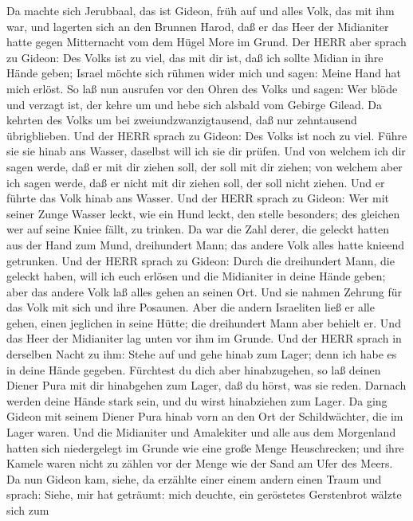  Da machte sich Jerubbaal, das ist Gideon, früh auf und
alles Volk, das mit ihm war, und lagerten sich an den Brunnen Harod, daß
er das Heer der Midianiter hatte gegen Mitternacht vom dem Hügel More im
Grund.  Der HERR aber sprach zu Gideon: Des Volks ist zu
viel, das mit dir ist, daß ich sollte Midian in ihre Hände geben; Israel
möchte sich rühmen wider mich und sagen: Meine Hand hat mich erlöst.
 So laß nun ausrufen vor den Ohren des Volks und sagen: Wer
blöde und verzagt ist, der kehre um und hebe sich alsbald vom Gebirge
Gilead. Da kehrten des Volks um bei zweiundzwanzigtausend, daß nur
zehntausend übrigblieben.  Und der HERR sprach zu Gideon:
Des Volks ist noch zu viel. Führe sie sie hinab ans Wasser, daselbst
will ich sie dir prüfen. Und von welchem ich dir sagen werde, daß er mit
dir ziehen soll, der soll mit dir ziehen; von welchem aber ich sagen
werde, daß er nicht mit dir ziehen soll, der soll nicht ziehen.
 Und er führte das Volk hinab ans Wasser. Und der HERR
sprach zu Gideon: Wer mit seiner Zunge Wasser leckt, wie ein Hund leckt,
den stelle besonders; des gleichen wer auf seine Kniee fällt, zu
trinken.  Da war die Zahl derer, die geleckt hatten aus der
Hand zum Mund, dreihundert Mann; das andere Volk alles hatte knieend
getrunken.  Und der HERR sprach zu Gideon: Durch die
dreihundert Mann, die geleckt haben, will ich euch erlösen und die
Midianiter in deine Hände geben; aber das andere Volk laß alles gehen an
seinen Ort.  Und sie nahmen Zehrung für das Volk mit sich
und ihre Posaunen. Aber die andern Israeliten ließ er alle gehen, einen
jeglichen in seine Hütte; die dreihundert Mann aber behielt er. Und das
Heer der Midianiter lag unten vor ihm im Grunde.  Und der
HERR sprach in derselben Nacht zu ihm: Stehe auf und gehe hinab zum
Lager; denn ich habe es in deine Hände gegeben.  Fürchtest
du dich aber hinabzugehen, so laß deinen Diener Pura mit dir hinabgehen
zum Lager,  daß du hörst, was sie reden. Darnach werden
deine Hände stark sein, und du wirst hinabziehen zum Lager. Da ging
Gideon mit seinem Diener Pura hinab vorn an den Ort der Schildwächter,
die im Lager waren.  Und die Midianiter und Amalekiter und
alle aus dem Morgenland hatten sich niedergelegt im Grunde wie eine
große Menge Heuschrecken; und ihre Kamele waren nicht zu zählen vor der
Menge wie der Sand am Ufer des Meers.  Da nun Gideon kam,
siehe, da erzählte einer einem andern einen Traum und sprach: Siehe, mir
hat geträumt: mich deuchte, ein geröstetes Gerstenbrot wälzte sich zum
